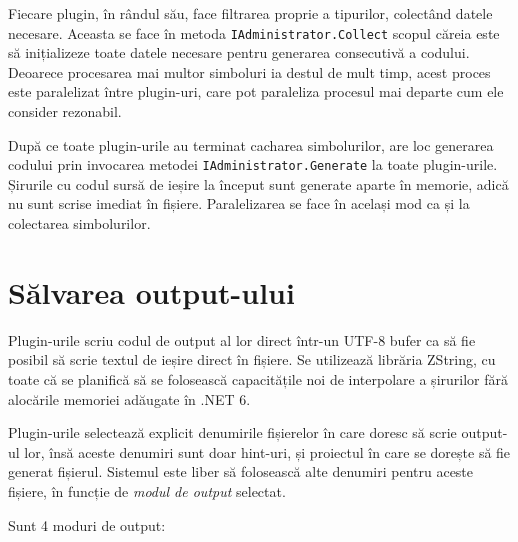 \documentclass[a4paper,12pt]{report}
\begin{document}
Fiecare plugin, în rândul său, face filtrarea proprie a tipurilor, colectând datele necesare.
Aceasta se face în metoda \texttt{IAdministrator.Collect} scopul căreia este să inițializeze toate datele necesare pentru generarea consecutivă a codului.
Deoarece procesarea mai multor simboluri ia destul de mult timp, acest proces este paralelizat între plugin-uri, care pot paraleliza procesul mai departe cum ele consider rezonabil.

După ce toate plugin-urile au terminat cacharea simbolurilor, are loc generarea codului prin invocarea metodei \texttt{IAdministrator.Generate} la toate plugin-urile.
Șirurile cu codul sursă de ieșire la început sunt generate aparte în memorie, adică nu sunt scrise imediat în fișiere.
Paralelizarea se face în același mod ca și la colectarea simbolurilor.

\section{Sălvarea output-ului}

Plugin-urile scriu codul de output al lor direct într-un UTF-8 bufer ca să fie posibil să scrie textul de ieșire direct în fișiere.
Se utilizează librăria ZString\cite{zstring_github}, cu toate că se planifică să se folosească capacitățile noi de interpolare a șirurilor fără alocările memoriei adăugate în .NET 6.\cite{string_interpolation_csharp_10}

Plugin-urile selectează explicit denumirile fișierelor în care doresc să scrie output-ul lor, însă aceste denumiri sunt doar hint-uri, și proiectul în care se dorește să fie generat fișierul.
Sistemul este liber să folosească alte denumiri pentru aceste fișiere, în funcție de \emph{modul de output} selectat.

Sunt 4 moduri de output:
\end{document}
